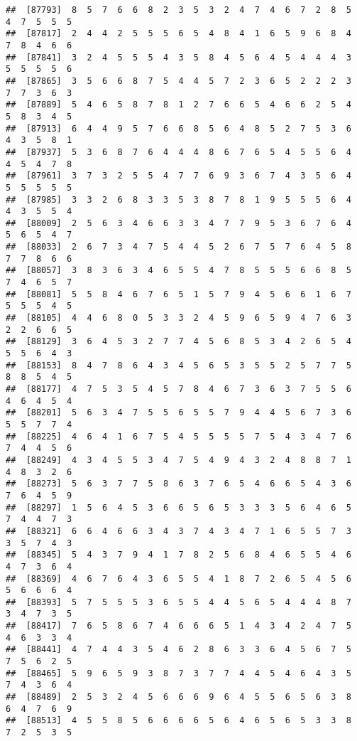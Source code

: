 \documentclass[
]{book}
\begin{document}
\begin{verbatim}
##  [87793]  8  5  7  6  6  8  2  3  5  3  2  4  7  4  6  7  2  8  5  4  7  5  5  5
##  [87817]  2  4  4  2  5  5  5  6  5  4  8  4  1  6  5  9  6  8  4  7  8  4  6  6
##  [87841]  3  2  4  5  5  5  4  3  5  8  4  5  6  4  5  4  4  4  3  5  5  5  5  6
##  [87865]  3  5  6  6  8  7  5  4  4  5  7  2  3  6  5  2  2  2  3  7  7  3  6  3
##  [87889]  5  4  6  5  8  7  8  1  2  7  6  6  5  4  6  6  2  5  4  5  8  3  4  5
##  [87913]  6  4  4  9  5  7  6  6  8  5  6  4  8  5  2  7  5  3  6  4  3  5  8  1
##  [87937]  5  3  6  8  7  6  4  4  4  8  6  7  6  5  4  5  5  6  4  4  5  4  7  8
##  [87961]  3  7  3  2  5  5  4  7  7  6  9  3  6  7  4  3  5  6  4  5  5  5  5  5
##  [87985]  3  3  2  6  8  3  3  5  3  8  7  8  1  9  5  5  5  6  4  4  3  5  5  4
##  [88009]  2  5  6  3  4  6  6  3  3  4  7  7  9  5  3  6  7  6  4  5  6  5  4  7
##  [88033]  2  6  7  3  4  7  5  4  4  5  2  6  7  5  7  6  4  5  8  7  7  8  6  6
##  [88057]  3  8  3  6  3  4  6  5  5  4  7  8  5  5  5  6  6  8  5  7  4  6  5  7
##  [88081]  5  5  8  4  6  7  6  5  1  5  7  9  4  5  6  6  1  6  7  5  5  5  4  5
##  [88105]  4  4  6  8  0  5  3  3  2  4  5  9  6  5  9  4  7  6  3  2  2  6  6  5
##  [88129]  3  6  4  5  3  2  7  7  4  5  6  8  5  3  4  2  6  5  4  5  5  6  4  3
##  [88153]  8  4  7  8  6  4  3  4  5  6  5  3  5  5  2  5  7  7  5  8  8  5  4  5
##  [88177]  4  7  5  3  5  4  5  7  8  4  6  7  3  6  3  7  5  5  6  4  6  4  5  4
##  [88201]  5  6  3  4  7  5  5  6  5  5  7  9  4  4  5  6  7  3  6  5  5  7  7  4
##  [88225]  4  6  4  1  6  7  5  4  5  5  5  5  7  5  4  3  4  7  6  7  4  4  5  6
##  [88249]  4  3  4  5  5  3  4  7  5  4  9  4  3  2  4  8  8  7  1  4  8  3  2  6
##  [88273]  5  6  3  7  7  5  8  6  3  7  6  5  4  6  6  5  4  3  6  7  6  4  5  9
##  [88297]  1  5  6  4  5  3  6  6  5  6  5  3  3  3  5  6  4  6  5  7  4  4  7  3
##  [88321]  6  6  4  6  6  3  4  3  7  4  3  4  7  1  6  5  5  7  3  3  5  7  4  3
##  [88345]  5  4  3  7  9  4  1  7  8  2  5  6  8  4  6  5  5  4  6  4  7  3  6  4
##  [88369]  4  6  7  6  4  3  6  5  5  4  1  8  7  2  6  5  4  5  6  5  6  6  6  4
##  [88393]  5  7  5  5  5  3  6  5  5  4  4  5  6  5  4  4  4  8  7  3  4  7  3  5
##  [88417]  7  6  5  8  6  7  4  6  6  6  5  1  4  3  4  2  4  7  5  4  6  3  3  4
##  [88441]  4  7  4  4  3  5  4  6  2  8  6  3  3  6  4  5  6  7  5  7  5  6  2  5
##  [88465]  5  9  6  5  9  3  8  7  3  7  7  4  4  5  4  6  4  3  5  7  4  3  6  4
##  [88489]  2  5  3  2  4  5  6  6  6  9  6  4  5  5  6  5  6  3  8  6  4  7  6  9
##  [88513]  4  5  5  8  5  6  6  6  6  5  6  4  6  5  6  5  3  3  8  7  2  5  3  5

\end{verbatim}
\end{document}
